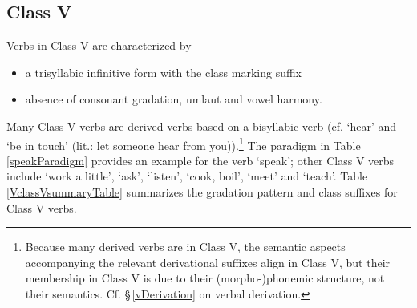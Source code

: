 \FloatBarrier

\subsection{Class V}\label{VclassV}
Verbs in Class V are characterized by 
\begin{itemize}
\item{a trisyllabic infinitive form with the class marking suffix }
\item{absence of consonant gradation, umlaut and vowel harmony.} 
\end{itemize}
Many Class V verbs are derived verbs based on a bisyllabic verb (cf.  ‘hear’ and  ‘be in touch’ (lit.: let someone hear from you)).\footnote{Because many derived verbs are in Class V, the semantic aspects accompanying the relevant derivational suffixes align in Class V, but their membership in Class V is due to their \mbox{(morpho-)phonemic} structure, not their semantics. Cf. §\,\ref{vDerivation} on verbal derivation.} 
The paradigm in Table \vref{speakParadigm} provides an example for the verb  ‘speak’; 
other Class V verbs include  ‘work a little’,  ‘ask’,  ‘listen’,  ‘cook, boil’,  ‘meet’ and  ‘teach’. 
Table \vref{VclassVsummaryTable} summarizes the gradation pattern and class suffixes for Class V verbs. %
